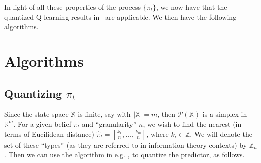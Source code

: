 \documentclass{article}
\begin{document}
In light of all these properties of the process \( \{\pi_t\} \), we now have that the quantized Q-learning results in~\cite{Kara} are applicable. We then have the following algorithms.

\section{Algorithms}

\subsection{Quantizing \( \pi_t \)}\label{algorithm1}
Since the state space \( \mathbb{X} \) is finite, say with \( |\mathbb{X}| = m \), then \( \mathcal{P}(\mathbb{X}) \) is a simplex in \( \mathbb{R}^m \). For a given belief \( \pi_t \) and ``granularity'' \( n \), we wish to find the nearest (in terms of Eucilidean distance) \( \hat{\pi}_t = [\frac{k_1}{n}, \ldots, \frac{k_m}{n}] \), where \( k_i \in \mathbb{Z} \). We will denote the set of these ``types'' (as they are referred to in information theory contexts) by \( \mathbb{Z}_n \). Then we can use the algorithm in e.g. \cite{Reznik}, \cite{Saldi} to quantize the predictor, as follows. %

\newcommand\showline{\stepcounter{linenum}\thelinenum}
\end{document}
